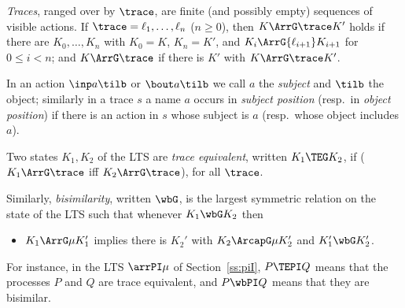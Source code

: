  \emph{Traces}, ranged over by $\trace$,  are finite (and possibly empty) sequences of
 visible actions.
If $\trace =\ell_1, \ldots, \ell_n$ ($n\geq 0$), then  $K \ArrG \trace K'$  holds if there
are $K_0, \ldots, K_n$ with $K_0 = K$, $K_n =K'$, and $K_i \ArrG{\ell_{i+1}} K_{i+1}$  for
$0\leq i < n$; and    $K \ArrG \trace $ if there is $K' $ with $K \ArrG \trace  K'$. 

In an action $\inp a\tilb$ or $\bout a\tilb$ we call $a$ the \emph{subject} and
$\tilb$ the object; similarly in a trace $s$ a name $a$ occurs in \emph{subject position}
(resp.\ in \emph{object position})
if there is an action in $s$ whose subject is $a$ (resp.\ whose object includes $a$). 

Two states $K_1, K_2 $ of the LTS   are \emph{trace equivalent}, written 
 $K_1 \TEG K_2$, if    ($K_1 \ArrG \trace $  iff 
$K_2 \ArrG \trace  $), for all $\trace$. 
 
Similarly,  \emph{bisimilarity}, written $\wbG $,
 is the largest symmetric relation on the state of the LTS such that 
whenever $K_1 \wbG K_2$ then 
\begin{itemize}
\item $K_1 \ArrG \mu  K_1'$ implies there is $K_2'$ with 
$K_2 \ArcapG \mu  K_2'$ and $K'_1 \wbG K'_2$.
\end{itemize} 
For instance, in the \piI LTS   $\arrPI \mu $ of Section~\ref{ss:piI}, 
$P \TEPI Q$ means that the \piI  processes $P$ and $Q$ are trace equivalent, and 
$P \wbPI Q$ means that they are bisimilar.

